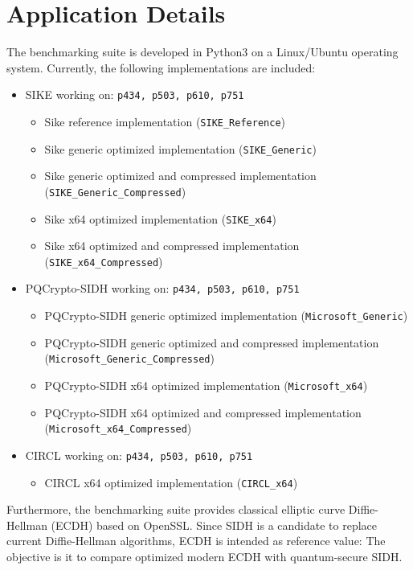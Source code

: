 \section{Application Details}
The benchmarking suite is developed in Python3 on a Linux/Ubuntu operating system. Currently, the following implementations are included:
\begin{itemize}
\item SIKE working on: \texttt{p434, p503, p610, p751}
	\begin{itemize}
	\item Sike reference implementation (\texttt{SIKE\_Reference})
	\item Sike generic optimized implementation (\texttt{SIKE\_Generic})
	\item Sike generic optimized and compressed implementation (\texttt{SIKE\_Generic\_Compressed})
	\item Sike x64 optimized implementation (\texttt{SIKE\_x64})
	\item Sike x64 optimized and compressed implementation (\texttt{SIKE\_x64\_Compressed})
	\end{itemize}
\item PQCrypto-SIDH working on: \texttt{p434, p503, p610, p751}
	\begin{itemize}
	\item PQCrypto-SIDH generic optimized implementation (\texttt{Microsoft\_Generic})
	\item PQCrypto-SIDH generic optimized and compressed implementation \\ (\texttt{Microsoft\_Generic\_Compressed})
	\item PQCrypto-SIDH x64 optimized implementation (\texttt{Microsoft\_x64})
	\item PQCrypto-SIDH x64 optimized and compressed implementation \\ (\texttt{Microsoft\_x64\_Compressed})
	\end{itemize}
\item CIRCL working on: \texttt{p434, p503, p610, p751}
	\begin{itemize}
	\item CIRCL x64 optimized implementation (\texttt{CIRCL\_x64})
	\end{itemize}
\end{itemize}
Furthermore, the benchmarking suite provides classical elliptic curve Diffie-Hellman (ECDH) based on OpenSSL. Since SIDH is a candidate to replace current Diffie-Hellman algorithms, ECDH is intended as reference value: The objective is it to compare optimized modern ECDH with quantum-secure SIDH.\\
